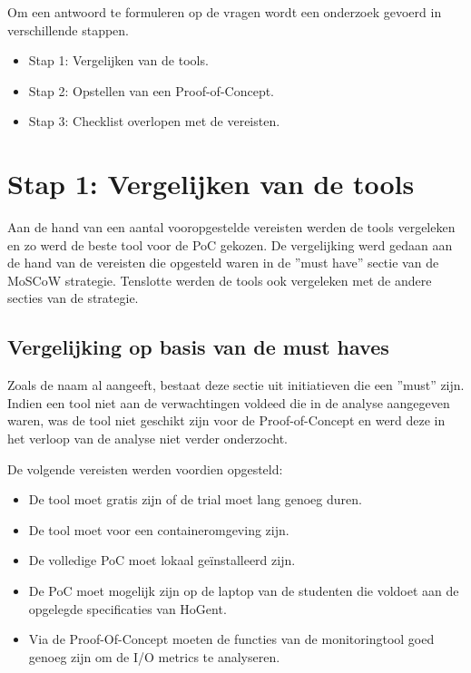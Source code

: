 Om een antwoord te formuleren op de vragen wordt een onderzoek gevoerd in verschillende stappen.

\begin{itemize}
    \item Stap 1: Vergelijken van de tools.
    \item Stap 2: Opstellen van een Proof-of-Concept.
    \item Stap 3: Checklist overlopen met de vereisten.
\end{itemize}

\section{Stap 1: Vergelijken van de tools}
 
Aan de hand van een aantal vooropgestelde vereisten werden de tools vergeleken en zo werd de beste tool voor de PoC gekozen. De vergelijking werd gedaan aan de hand van de vereisten die opgesteld waren in de ''must have'' sectie van de MoSCoW strategie. Tenslotte werden de tools ook vergeleken met de andere secties van de strategie.
\subsection{Vergelijking op basis van de must haves}

Zoals de naam al aangeeft, bestaat deze sectie uit initiatieven die een ''must'' zijn. Indien een tool niet aan de verwachtingen voldeed die in de analyse aangegeven waren, was de tool niet geschikt zijn voor de Proof-of-Concept en werd deze in het verloop van de analyse niet verder onderzocht.

De volgende vereisten werden voordien opgesteld:

\begin{itemize}
    \item De tool moet gratis zijn of de trial moet lang genoeg duren.
    \item De tool moet voor een containeromgeving zijn.
    \item De volledige PoC moet lokaal geïnstalleerd zijn.
    \item De PoC moet mogelijk zijn op de laptop van de studenten die voldoet aan de opgelegde specificaties van HoGent.
    \item Via de Proof-Of-Concept moeten de functies van de monitoringtool goed genoeg zijn om de I/O metrics te analyseren.
\end{itemize}

